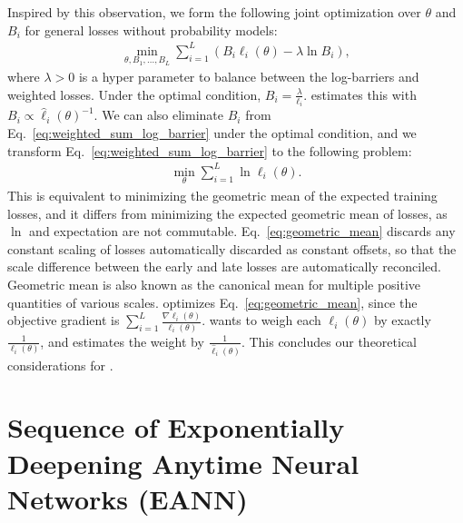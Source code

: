 Inspired by this observation, we form the following joint optimization over $\theta$ and $B_i$ for general losses without probability models:
\begin{align}
    \min _{\theta, B_1,...,B_L} \sum _{i=1}^L (B_i \ell _i(\theta) - \lambda \ln B_i),
    \label{eq:weighted_sum_log_barrier}
\end{align}
where $\lambda > 0$ is a hyper parameter to balance between the log-barriers and weighted losses. Under the optimal condition, $B_i=\frac{\lambda}{\ell_i}$. \adaloss estimates this with $B_i \propto \hat{\ell}_i(\theta)^{-1}$.  
We can also eliminate $B_i$ from Eq.~\ref{eq:weighted_sum_log_barrier} under the optimal condition, and we transform Eq.~\ref{eq:weighted_sum_log_barrier} to the following problem:
\begin{align}
    \min _{\theta} \sum _{i=1}^L \ln \ell _i (\theta).
    \label{eq:geometric_mean}
\end{align}
This is equivalent to minimizing the geometric mean of the expected training losses, and it differs from minimizing the expected geometric mean of losses, as $\ln$ and expectation are not commutable. 
Eq.~\ref{eq:geometric_mean} discards any constant scaling of losses automatically discarded as constant offsets, so that the scale difference between the early and late losses are automatically reconciled. Geometric mean is also known as the canonical mean for multiple positive quantities of various scales. \adaloss optimizes  Eq.~\ref{eq:geometric_mean}, since the objective gradient is $\sum _{i=1}^L \frac{ \nabla \ell _i (\theta)} {\ell_i (\theta)}$. \adaloss wants to weigh each $\ell_i(\theta)$ by exactly $\frac{1}{{\ell}_i (\theta) }$, and estimates the weight by $\frac{1}{\hat {\ell}_i (\theta) }$.
This concludes our theoretical considerations for \adaloss.







\section{Sequence of Exponentially Deepening Anytime Neural Networks (EANN)}
\label{sec:eann}


